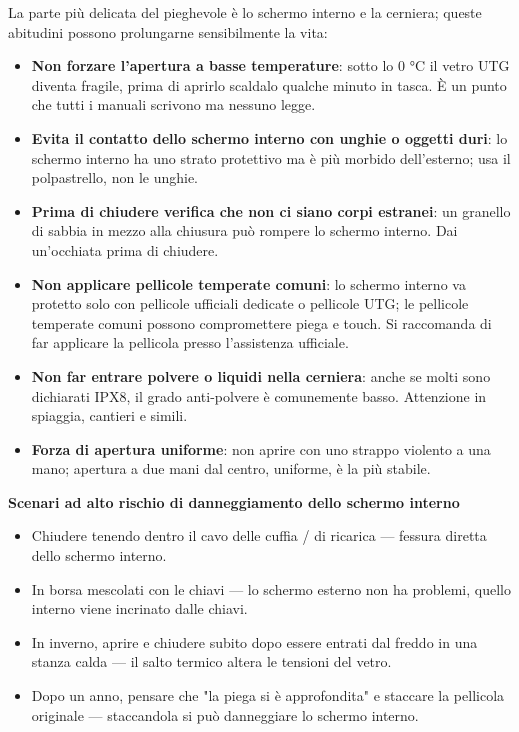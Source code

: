
La parte più delicata del pieghevole è lo schermo interno e la cerniera; queste abitudini possono prolungarne sensibilmente la vita:

\begin{itemize}
  \item \textbf{Non forzare l'apertura a basse temperature}: sotto lo 0 °C il vetro UTG diventa fragile, prima di aprirlo scaldalo qualche minuto in tasca. È un punto che tutti i manuali scrivono ma nessuno legge.
  \item \textbf{Evita il contatto dello schermo interno con unghie o oggetti duri}: lo schermo interno ha uno strato protettivo ma è più morbido dell'esterno; usa il polpastrello, non le unghie.
  \item \textbf{Prima di chiudere verifica che non ci siano corpi estranei}: un granello di sabbia in mezzo alla chiusura può rompere lo schermo interno. Dai un'occhiata prima di chiudere.
  \item \textbf{Non applicare pellicole temperate comuni}: lo schermo interno va protetto solo con pellicole ufficiali dedicate o pellicole UTG; le pellicole temperate comuni possono compromettere piega e touch. Si raccomanda di far applicare la pellicola presso l'assistenza ufficiale.
  \item \textbf{Non far entrare polvere o liquidi nella cerniera}: anche se molti sono dichiarati IPX8, il grado anti-polvere è comunemente basso. Attenzione in spiaggia, cantieri e simili.
  \item \textbf{Forza di apertura uniforme}: non aprire con uno strappo violento a una mano; apertura a due mani dal centro, uniforme, è la più stabile.
\end{itemize}

\textbf{Scenari ad alto rischio di danneggiamento dello schermo interno}\par

\begin{itemize}
  \item Chiudere tenendo dentro il cavo delle cuffia / di ricarica — fessura diretta dello schermo interno.
  \item In borsa mescolati con le chiavi — lo schermo esterno non ha problemi, quello interno viene incrinato dalle chiavi.
  \item In inverno, aprire e chiudere subito dopo essere entrati dal freddo in una stanza calda — il salto termico altera le tensioni del vetro.
  \item Dopo un anno, pensare che "la piega si è approfondita" e staccare la pellicola originale — staccandola si può danneggiare lo schermo interno.
\end{itemize}

